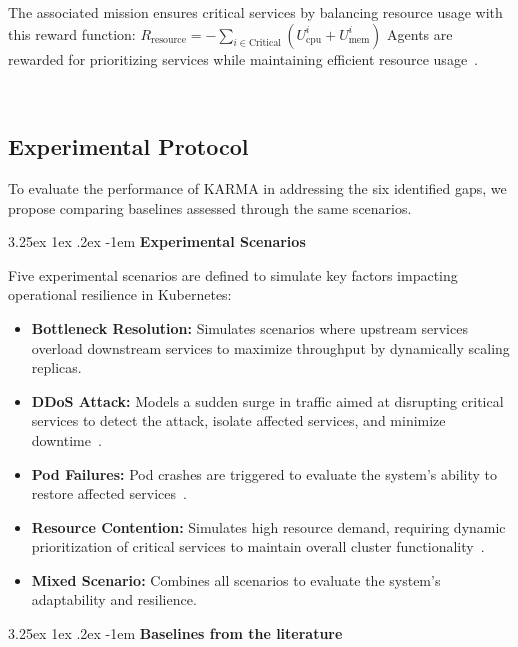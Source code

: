 \documentclass[conference]{IEEEtran}
\makeatletter
\renewcommand\paragraph{\@startsection{paragraph}{5}{\z@}%
  {3.25ex \@plus1ex \@minus.2ex}%
  {-1em}%
  {\normalfont\normalsize\bfseries}}
\makeatother
\begin{document}
The associated mission ensures critical services by balancing resource usage with this reward function:
$R_{\text{resource}} = - \sum_{i \in \text{Critical}} \left( U_{\text{cpu}}^i + U_{\text{mem}}^i \right)$
Agents are rewarded for prioritizing services while maintaining efficient resource usage~\cite{smith2021autoscaling}.

\

\subsection{Experimental Protocol}

\noindent To evaluate the performance of KARMA in addressing the six identified gaps, we propose comparing baselines assessed through the same scenarios.

\paragraph{\textbf{Experimental Scenarios}}

\noindent Five experimental scenarios are defined to simulate key factors impacting operational resilience in Kubernetes:

\begin{itemize}
    \item \textbf{Bottleneck Resolution:} Simulates scenarios where upstream services overload downstream services to maximize throughput by dynamically scaling replicas.
    \item \textbf{DDoS Attack:} Models a sudden surge in traffic aimed at disrupting critical services to detect the attack, isolate affected services, and minimize downtime~\cite{koller2019ddos}.
    \item \textbf{Pod Failures:} Pod crashes are triggered to evaluate the system's ability to restore affected services~\cite{burns2016borg}.
    \item \textbf{Resource Contention:} Simulates high resource demand, requiring dynamic prioritization of critical services to maintain overall cluster functionality~\cite{zhang2020resource}.
    \item \textbf{Mixed Scenario:} Combines all scenarios to evaluate the system's adaptability and resilience.
\end{itemize}

\paragraph{\textbf{Baselines from the literature}}
\end{document}
